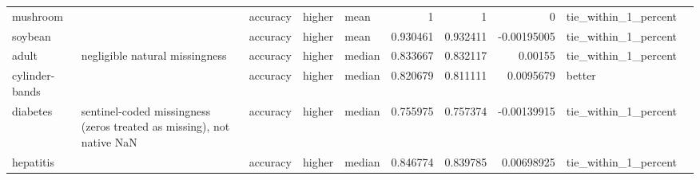 \begin{table}[ht]
{\begin{tabular}{lllllrrrll}
 mushroom       &                                                                       & accuracy                       & higher             & mean             &                   1        &               1        &                     0           & tie\_within\_1\_percent &                                                                                                                    \\
 soybean        &                                                                       & accuracy                       & higher             & mean             &                   0.930461 &               0.932411 &                    -0.00195005  & tie\_within\_1\_percent &                                                                                                                    \\
 adult          & negligible natural missingness                                        & accuracy                       & higher             & median           &                   0.833667 &               0.832117 &                     0.00155     & tie\_within\_1\_percent &                                                                                                                    \\
 cylinder-bands &                                                                       & accuracy                       & higher             & median           &                   0.820679 &               0.811111 &                     0.0095679   & better               &                                                                                                                    \\
 diabetes       & sentinel-coded missingness (zeros treated as missing), not native NaN & accuracy                       & higher             & median           &                   0.755975 &               0.757374 &                    -0.00139915  & tie\_within\_1\_percent &                                                                                                                    \\
 hepatitis      &                                                                       & accuracy                       & higher             & median           &                   0.846774 &               0.839785 &                     0.00698925  & tie\_within\_1\_percent &                                                                                                                    \\

\end{tabular}}
\end{table}
